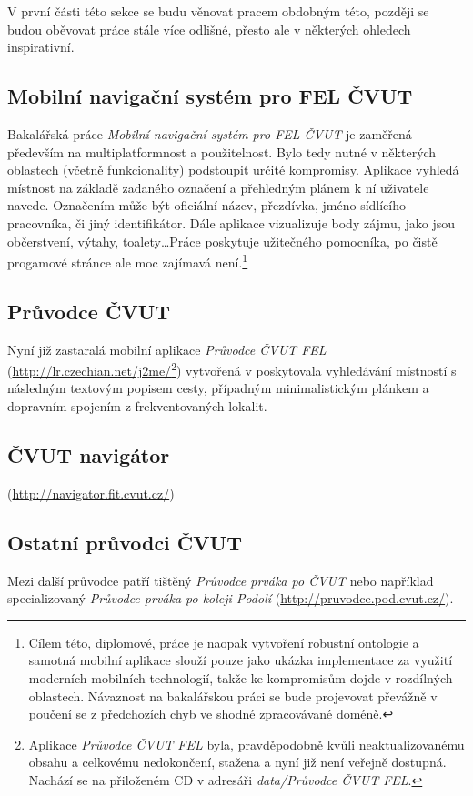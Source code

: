 V první části této sekce se budu věnovat pracem obdobným této, později se budou oběvovat práce stále více odlišné, přesto ale v některých ohledech inspirativní.

\subsection{Mobilní navigační systém pro FEL ČVUT}
Bakalářská práce \emph{Mobilní navigační systém pro FEL ČVUT} \cite{Bakalarka} je zaměřená především na multiplatformnost a použitelnost. Bylo tedy nutné v některých oblastech (včetně funkcionality) podstoupit určité kompromisy. Aplikace vyhledá místnost na základě zadaného označení a přehledným plánem k ní uživatele navede. Označením může být oficiální název, přezdívka, jméno sídlícího pracovníka, či jiný identifikátor. Dále aplikace vizualizuje body zájmu, jako jsou občerstvení, výtahy, toalety\dots Práce poskytuje užitečného pomocníka, po čistě progamové stránce ale moc zajímavá není.\footnote{Cílem této, diplomové, práce je naopak vytvoření robustní ontologie a samotná mobilní aplikace slouží pouze jako ukázka implementace za využití moderních mobilních technologií, takže ke kompromisům dojde v rozdílných oblastech. Návaznost na bakalářskou práci se bude projevovat převážně v poučení se z předchozích chyb ve shodné zpracovávané doméně.}

\subsection{Průvodce ČVUT}
Nyní již zastaralá mobilní aplikace \emph{Průvodce ČVUT FEL} (\url{http://lr.czechian.net/j2me/}\footnote{Aplikace \emph{Průvodce ČVUT FEL} byla, pravděpodobně kvůli neaktualizovanému obsahu a celkovému nedokončení, stažena a nyní již není veřejně dostupná. Nachází se na přiloženém \gls{CD} v adresáři \textit{data/Průvodce ČVUT FEL}. }) vytvořená v  poskytovala vyhledávání místností s následným textovým popisem cesty, případným minimalistickým plánkem a dopravním spojením z frekventovaných lokalit.

\subsection{ČVUT navigátor}
 (\url{http://navigator.fit.cvut.cz/})

\subsection{Ostatní průvodci ČVUT}
Mezi další průvodce patří tištěný \emph{Průvodce prváka po ČVUT} \cite{PruvodcePrvaka} nebo například specializovaný \emph{Průvodce prváka po koleji Podolí} (\url{http://pruvodce.pod.cvut.cz/}).

